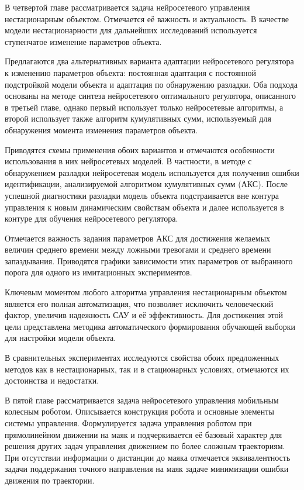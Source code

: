 

В четвертой главе рассматривается задача нейросетевого управления
нестационарным объектом.  Отмечается её важность и актуальность.  В
качестве модели нестационарности для дальнейших исследований
используется ступенчатое изменение параметров объекта.

Предлагаются два альтернативных варианта адаптации нейросетевого
регулятора к изменению параметров объекта: постоянная адаптация с
постоянной подстройкой модели объекта и адаптация по обнаружению
разладки.  Оба подхода основаны на методе синтеза нейросетевого
оптимального регулятора, описанного в третьей главе, однако первый
использует только нейросетевые алгоритмы, а второй использует также
алгоритм кумулятивных сумм, используемый для обнаружения момента
изменения параметров объекта.

Приводятся схемы применения обоих вариантов и отмечаются особенности
использования в них нейросетевых моделей.  В частности, в методе с
обнаружением разладки нейросетевая модель используется для получения
ошибки идентификации, анализируемой алгоритмом кумулятивных сумм
(АКС).  После успешной диагностики разладки модель объекта
подстраивается вне контура управления к новым динамическим свойствам
объекта и далее используется в контуре для обучения нейросетевого
регулятора.

Отмечается важность задания параметров АКС для достижения желаемых
величин среднего времени между ложными тревогами и среднего времени
запаздывания.  Приводятся графики зависимости этих параметров от
выбранного порога для одного из имитационных экспериментов.

Ключевым моментом любого алгоритма управления нестационарным объектом
является его полная автоматизация, что позволяет исключить
человеческий фактор, увеличив надежность САУ и её эффективность.  Для
достижения этой цели представлена методика автоматического
формирования обучающей выборки для настройки модели объекта.

В сравнительных экспериментах исследуются свойства обоих предложенных
методов как в нестационарных, так и в стационарных условиях,
отмечаются их достоинства и недостатки.


В пятой главе рассматривается задача нейросетевого управления
мобильным колесным роботом.  Описывается конструкция робота и основные
элементы системы управления.  Формулируется задача управления роботом
при прямолинейном движении на маяк и подчеркивается её базовый
характер для решения других задач управления движением по более
сложным траекториям.  При отсутствии информации о дистанции до маяка
отмечается эквивалентность задачи поддержания точного направления на
маяк задаче минимизации ошибки движения по траектории.

